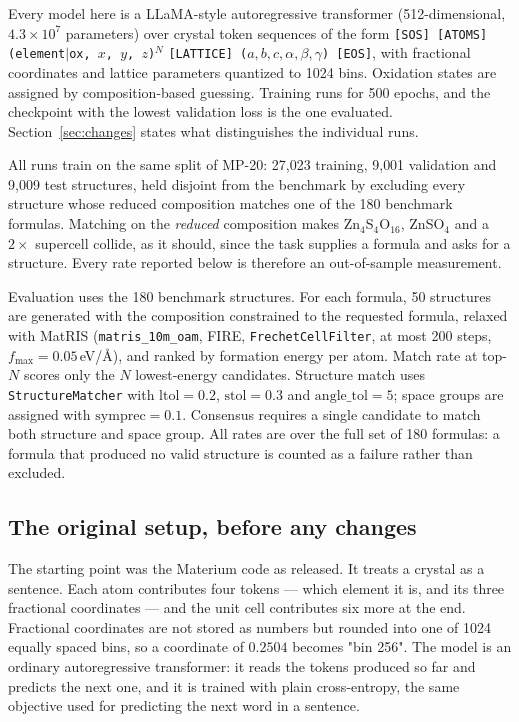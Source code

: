\documentclass[manuscript,screen,review]{acmart}
\begin{document}
Every model here is a LLaMA-style autoregressive transformer
(512-dimensional, $4.3\times10^{7}$ parameters) over crystal token sequences of
the form \texttt{[SOS] [ATOMS] (element$\vert$ox, $x$, $y$, $z$)$^{N}$}
\texttt{[LATTICE] ($a,b,c,\alpha,\beta,\gamma$) [EOS]}, with fractional
coordinates and lattice parameters quantized to 1024 bins. Oxidation states are
assigned by composition-based guessing. Training runs for 500 epochs, and the
checkpoint with the lowest validation loss is the one evaluated.
Section~\ref{sec:changes} states what distinguishes the individual runs.

All runs train on the same split of MP-20: 27{,}023 training, 9{,}001
validation and 9{,}009 test structures, held disjoint from the benchmark by
excluding every structure whose reduced composition matches one of the 180
benchmark formulas. Matching on the \emph{reduced} composition makes
Zn$_4$S$_4$O$_{16}$, ZnSO$_4$ and a $2\times$ supercell collide, as it should,
since the task supplies a formula and asks for a structure. Every rate reported
below is therefore an out-of-sample measurement.

Evaluation uses the 180 benchmark structures. For each formula, 50 structures are
generated with the composition constrained to the requested formula, relaxed
with MatRIS (\texttt{matris\_10m\_oam}, FIRE, \texttt{FrechetCellFilter}, at
most 200 steps, $f_{\max} = 0.05$\,eV/\AA), and ranked by formation energy per
atom. Match rate at top-$N$ scores only the $N$ lowest-energy candidates.
Structure match uses \texttt{StructureMatcher} with
$\mathrm{ltol} = 0.2$, $\mathrm{stol} = 0.3$ and $\mathrm{angle\_tol} = 5$;
space groups are assigned with $\mathrm{symprec} = 0.1$. Consensus requires a
single candidate to match both structure and space group. All rates are over
the full set of 180 formulas: a formula that produced no valid structure is
counted as a failure rather than excluded.

\subsection{The original setup, before any changes}
\label{sec:original}

The starting point was the Materium code as released. It treats a crystal as a
sentence. Each atom contributes four tokens --- which element it is, and its
three fractional coordinates --- and the unit cell contributes six more at the
end. Fractional coordinates are not stored as numbers but rounded into one of
1024 equally spaced bins, so a coordinate of $0.2504$ becomes "bin 256". The
model is an ordinary autoregressive transformer: it reads the tokens produced so
far and predicts the next one, and it is trained with plain cross-entropy, the
same objective used for predicting the next word in a sentence.
\end{document}
